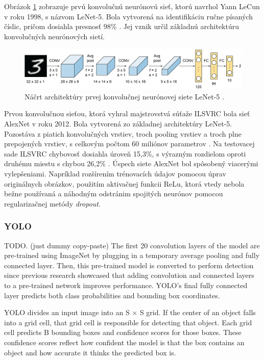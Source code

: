 Obrázok \ref{img:lenet} zobrazuje prvú konvolučnú neurónovú sieť, ktorú navrhol Yann LeCun v roku 1998, s názvom LeNet-5. Bola vytvorená na identifikáciu ručne písaných číslic, pričom dosiahla presnosť 98\% \cite{lenet}. Jej vznik určil základnú architektúru konvolučných neurónových sietí.

\begin{figure}[ht]
    \centering
    \includegraphics[width=1\textwidth]{images/02/lenet5.png}
    \caption{Náčrt architektúry prvej konvolučnej neurónovej siete LeNet-5 \cite{lenet}.}
    \label{img:lenet}
\end{figure}

Prvou konvolučnou sieťou, ktorá vyhral majstrovstvá súťaže ILSVRC bola sieť AlexNet v roku 2012. Bola vytvorená zo základnej architektúry LeNet-5. Pozostáva z piatich konvolučných vrstiev, troch pooling vrstiev a troch plne prepojených vrstiev, s celkovým počtom 60 miliónov parametrov \cite{AlexNet}. Na testovacej sade ILSVRC chybovosť dosiahla úroveň 15,3\%, s výrazným rozdielom oproti druhému miestu s chybou 26,2\% \cite{ilsvrc}. Úspech siete AlexNet bol spôsobený viacerými vylepšeniami. Napríklad rozšírením trénovacích údajov pomocou úprav originálnych obrázkov, použitím aktivačnej funkcii ReLu, ktorá vtedy nebola bežne používaná a náhodným odstránim spojitých neurónov pomocou regularizačnej metódy \textit{dropout}.

\subsubsection{YOLO}
TODO. (just dummy copy-paste) The first 20 convolution layers of the model are pre-trained using ImageNet by plugging in a temporary average pooling and fully connected layer. Then, this pre-trained model is converted to perform detection since previous research showcased that adding convolution and connected layers to a pre-trained network improves performance. YOLO’s final fully connected layer predicts both class probabilities and bounding box coordinates.

YOLO divides an input image into an S × S grid. If the center of an object falls into a grid cell, that grid cell is responsible for detecting that object. Each grid cell predicts B bounding boxes and confidence scores for those boxes. These confidence scores reflect how confident the model is that the box contains an object and how accurate it thinks the predicted box is.

